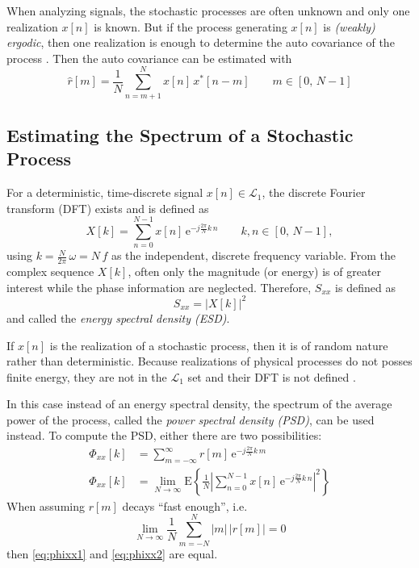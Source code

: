 When analyzing signals, the stochastic processes are often unknown and only one realization $x[n]$ is known. But if the process generating $x[n]$ is \textit{(weakly) ergodic}, then one realization is enough to determine the auto covariance of the process \cite[p.~252]{Puente2019}.
Then the auto covariance can be estimated with
\begin{equation}\label{eq:autocovarianveEstimation}
\hat{r}[m] = \frac{1}{N} \sum_{n=m+1}^{N} x[n]\,x^\ast[n-m]\qquad m \in [0,\,N-1]
\end{equation} 


\subsection{Estimating the Spectrum of a Stochastic Process}
For a deterministic, time-discrete signal $x[n] \in \mathcal{L}_1$, the discrete Fourier transform (DFT) exists\cite{Lapidoth2019} and is defined as
\begin{equation}
X[k] = \sum_{n=0}^{N-1} x[n]\,\text{e}^{-j\frac{2\pi}{N}k\,n}\qquad k,n \in [0,\,N-1],
\end{equation}
using $k=\frac{N}{2\pi}\,\omega = N\,f$ as the independent, discrete frequency variable. 
From the complex sequence $X[k]$, often only the magnitude (or energy) is of greater interest while the phase information are neglected. 
Therefore, $S_{xx}$ is defined as
\begin{equation}
S_{xx} = \left|X[k]\right|^2
\end{equation}
and called the \textit{energy spectral density (ESD)}.

If $x[n]$ is the realization of a stochastic process, then it is of random nature rather than deterministic.
Because realizations of physical processes do not posses finite energy, they are not in the $\mathcal{L}_1$ set and their DFT is not defined \cite[p.~5]{Stoica1997}.

In this case instead of an energy spectral density, the spectrum of the average power of the process, called the \textit{power spectral density (PSD)}, can be used instead.
To compute the PSD, either there are two possibilities:
\begin{align}
\Phi_{xx}[k] &= \sum_{m=-\infty}^{\infty} r[m]\,\text{e}^{-j\frac{2\pi}{N}k\,m} \label{eq:phixx1}\\
\Phi_{xx}[k] &= \lim_{N\rightarrow\infty} \text{E}\left\{\frac{1}{N}\left|\sum_{n=0}^{N-1} x[n]\,\text{e}^{-j\frac{2\pi}{N}k\,n}\right|^2 \right\} \label{eq:phixx2}
\end{align}
When assuming $r[m]$ decays ``fast enough'', i.e.
\begin{equation}
\lim_{N\rightarrow\infty} \frac{1}{N} \sum_{m=-N}^{N} |m|\,\left|r[m]\right| = 0
\end{equation}
then \autoref{eq:phixx1} and \autoref{eq:phixx2} are equal\cite[p.~7]{Stoica1997}.

